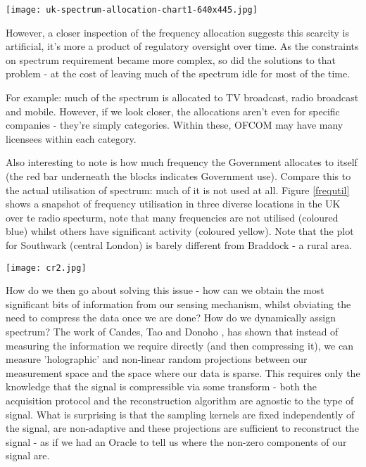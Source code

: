 \begin{figure*}[h]
\centering
\texttt{[image: uk-spectrum-allocation-chart1-640x445.jpg]}
\caption{A digram of current Spectral allocation \cite{Strategy2013}}
\label{spectrumalloc}
\end{figure*}

However, a closer inspection of the frequency allocation suggests this scarcity is artificial, it's more a product of regulatory oversight over time. As the constraints on spectrum requirement became more complex, so did the solutions to that problem - at the cost of leaving much of the spectrum idle for most of the time. 

For example: much of the spectrum is allocated to TV broadcast, radio broadcast and mobile. However, if we look closer, the allocations aren't even for specific companies - they're simply categories. Within these, OFCOM may have many licensees within each category.

Also interesting to note is how much frequency the Government allocates to itself (the red bar underneath the blocks indicates Government use). Compare this to the actual utilisation of spectrum: much of it is not used at all. Figure \ref{frequtil} shows a snapshot of frequency utilisation in three diverse locations in the UK over te radio specturm, note that many frequencies are not utilised (coloured blue) whilst others have significant activity (coloured yellow). Note that the plot for Southwark (central London) is barely different from Braddock - a rural area. 

\begin{figure*}[h]
\centering
\texttt{[image: cr2.jpg]}
\caption{A snapshot of frequency utilisation in various areas: many frequencies are not used at all, whilst there is significant activity on others \cite{Burbidge2007}}
\label{frequtil}
\end{figure*}

How do we then go about solving this issue - how can we obtain the most significant bits of information from our sensing mechanism, whilst obviating the need to compress the data once we are done? How do we dynamically assign spectrum? The work of Candes, Tao \cite{Candes2006} and Donoho \cite{donoho2}, has shown that instead of measuring the information we require directly (and then compressing it), we can measure 'holographic' and non-linear random projections between our measurement space and the space where our data is sparse. This requires only the knowledge that the signal is compressible via some transform - both the acquisition protocol and the reconstruction algorithm are agnostic to the type of signal. What is surprising is that the sampling kernels are fixed independently of the signal, are non-adaptive and these projections are sufficient to reconstruct the signal - as if we had an Oracle to tell us where the non-zero components of our signal are. 

